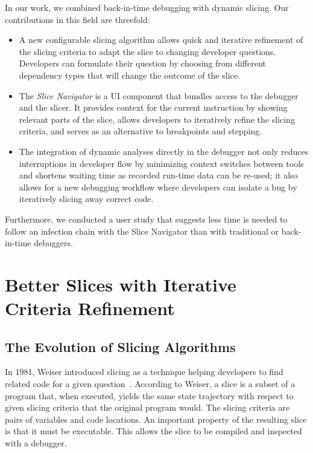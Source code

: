 In our work, we combined back-in-time debugging with dynamic slicing.
Our contributions in this field are threefold:
\begin{itemize}
	\item A new configurable slicing algorithm allows quick and iterative refinement of the slicing criteria to adapt the slice to changing developer questions.
	Developers can formulate their question by choosing from different dependency types that will change the outcome of the slice.
	\item The \emph{Slice Navigator} is a UI component that bundles access to the debugger and the slicer.
		It provides context for the current instruction by showing relevant parts of the slice, allows developers to iteratively refine the slicing criteria, and serves as an alternative to breakpoints and stepping.
	\item The integration of dynamic analyses directly in the debugger not only reduces interruptions in developer flow by minimizing context switches between tools and shortens waiting time as recorded run-time data can be re-used; it also allows for a new debugging workflow where developers can isolate a bug by iteratively slicing away correct code.
\end{itemize}
Furthermore, we conducted a user study that suggests less time is needed to follow an infection chain with the Slice Navigator than with traditional or back-in-time debuggers.

\section{Better Slices with Iterative Criteria Refinement}


\subsection{The Evolution of Slicing Algorithms}

In 1981, Weiser introduced slicing as a technique helping developers to find related code for a given question~\cite{weiser_81_program_slicing}.
According to Weiser, a slice is a subset of a program that, when executed, yields the same state trajectory with respect to given slicing criteria that the original program would.
The slicing criteria are pairs of variables and code locations.
An important property of the resulting slice is that it must be executable.
This allows the slice to be compiled and inspected with a debugger.

